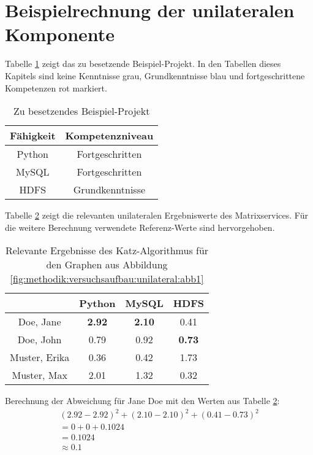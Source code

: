 \section{Beispielrechnung der unilateralen Komponente}
\label{ch:nebenrechnungen:unilateral}
Tabelle \ref{tbl:berechnungDerKatzZentralitaetPseudoMitarbeiter:tbl1} zeigt das zu besetzende Beispiel-Projekt. In den Tabellen dieses Kapitels sind keine Kenntnisse grau, Grundkenntnisse blau und fortgeschrittene Kompetenzen rot markiert.
\begin{table}[h]
	\centering
	\begin{tabular}{c|c}
		Fähigkeit & Kompetenzniveau \\
		\hline
		Python  & \cellcolor{usercolor}Fortgeschritten\\
		MySQL   & \cellcolor{usercolor}Fortgeschritten\\
		HDFS    & \cellcolor{itemcolor}Grundkenntnisse
	\end{tabular}
	\caption{Zu besetzendes Beispiel-Projekt}
	\label{tbl:berechnungDerKatzZentralitaetPseudoMitarbeiter:tbl1}
\end{table}

Tabelle \ref{tbl:berechnungDerKatzZentralitaetPseudoMitarbeiter:tbl2} zeigt die relevanten unilateralen Ergebniswerte des Matrixservices. Für die weitere Berechnung verwendete Referenz-Werte sind hervorgehoben.

\begin{table}[h]
	\centering
	\begin{tabular}{c|c|c|c}
		& Python & MySQL & HDFS\\ 
		\hline
		Doe, Jane     & \cellcolor{usercolor}\textbf{2.92} & \cellcolor{itemcolor}\textbf{2.10} & \cellcolor{exxetagray}0.41\\
		Doe, John     & \cellcolor{exxetagray}0.79 & \cellcolor{itemcolor}0.92 & \cellcolor{itemcolor}\textbf{0.73}\\
		Muster, Erika & \cellcolor{exxetagray}0.36 & \cellcolor{exxetagray}0.42 & \cellcolor{usercolor}1.73\\
		Muster, Max   & \cellcolor{itemcolor}2.01 & \cellcolor{itemcolor}1.32 & \cellcolor{exxetagray}0.32
	\end{tabular}
	\caption{Relevante Ergebnisse des Katz-Algorithmus für den Graphen aus Abbildung \ref{fig:methodik:versuchsaufbau:unilateral:abb1}}
	\label{tbl:berechnungDerKatzZentralitaetPseudoMitarbeiter:tbl2}
\end{table}

Berechnung der Abweichung für Jane Doe mit den Werten aus Tabelle \ref{tbl:berechnungDerKatzZentralitaetPseudoMitarbeiter:tbl2}:
\begin{gather}
	\nonumber (2.92-2.92)^2 + (2.10-2.10)^2 + (0.41-0.73)^2\\
	\nonumber = 0 + 0 + 0.1024\\
	\nonumber = 0.1024\\
	\approx 0.1
	\label{frml:nebenrechnungen:unilateral:jane}
\end{gather}

